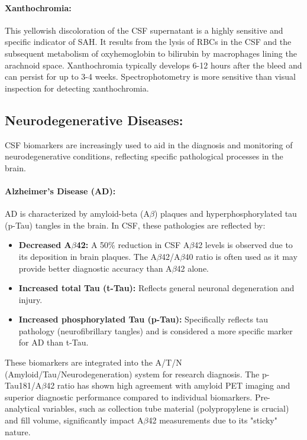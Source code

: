 	\paragraph{Xanthochromia:} This yellowish discoloration of the CSF supernatant is a highly sensitive and specific indicator of SAH. It results from the lysis of RBCs in the CSF and the subsequent metabolism of oxyhemoglobin to bilirubin by macrophages lining the arachnoid space. Xanthochromia typically develops 6-12 hours after the bleed and can persist for up to 3-4 weeks. Spectrophotometry is more sensitive than visual inspection for detecting xanthochromia.
	
	\subsection*{Neurodegenerative Diseases:}
	
	CSF biomarkers are increasingly used to aid in the diagnosis and monitoring of neurodegenerative conditions, reflecting specific pathological processes in the brain.
	
	\paragraph{Alzheimer's Disease (AD):} AD is characterized by amyloid-beta (A$\beta$) plaques and hyperphosphorylated tau (p-Tau) tangles in the brain. In CSF, these pathologies are reflected by:
	\begin{itemize}
		\item \textbf{Decreased A$\beta$42:} A 50\% reduction in CSF A$\beta$42 levels is observed due to its deposition in brain plaques. The A$\beta$42/A$\beta$40 ratio is often used as it may provide better diagnostic accuracy than A$\beta$42 alone.
		\item \textbf{Increased total Tau (t-Tau):} Reflects general neuronal degeneration and injury.
		\item \textbf{Increased phosphorylated Tau (p-Tau):} Specifically reflects tau pathology (neurofibrillary tangles) and is considered a more specific marker for AD than t-Tau.
	\end{itemize}
	These biomarkers are integrated into the A/T/N (Amyloid/Tau/Neurodegeneration) system for research diagnosis. The p-Tau181/A$\beta$42 ratio has shown high agreement with amyloid PET imaging and superior diagnostic performance compared to individual biomarkers. Pre-analytical variables, such as collection tube material (polypropylene is crucial) and fill volume, significantly impact A$\beta$42 measurements due to its "sticky" nature.
	
